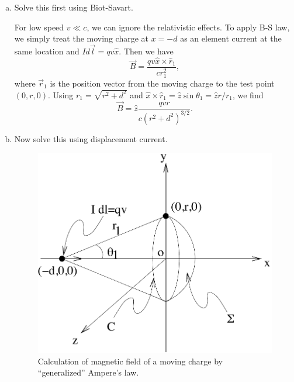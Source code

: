 \documentclass[makesolutionspdf]{esg8022pset}
\begin{document}
\begin{solution}
  \begin{enumerate}[(a)]
    \item Solve this first using Biot-Savart.

      For low speed $v\ll c$, we can ignore the relativistic effects.  To
      apply B-S law, we simply treat the moving charge at $x=-d$ as an
      element current at the same location and $I d\vec{l}=qv\hat{x}$.  Then
      we have 
      \begin{equation}
      \vec{B}= \frac{qv\hat{x}\times\hat{r}_1}{cr_1^2},
      \end{equation}
      where $\vec{r}_1$ is the position vector from the moving charge to the
      test point $(0,r,0)$.  Using $r_1 = \sqrt{r^2 + d^2}$ and $\hat
      x\times\hat r_1 = \hat z\sin\theta_1 = \hat z r/r_1$, we find
      \begin{equation}
      \vec{B}= \hat{z}\frac{qvr}{c(r^2+d^2)^{3/2}}.
      \end{equation}
    \item Now solve this using displacement current.

      \begin{figure}[H]
        \centering
        \includegraphics[width = 15cm]{m6}
        \caption{Calculation of magnetic field of a moving charge by
          ``generalized'' Ampere's law.}
      \end{figure}
      

\end{enumerate}
\end{solution}
\end{document}
